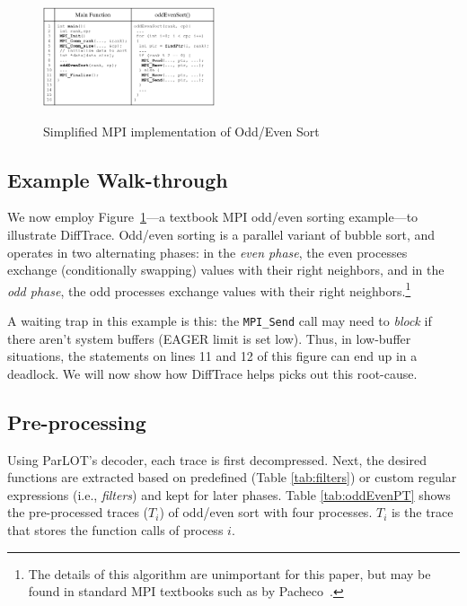 \begin{figure}[]
\centering
\caption{Simplified MPI implementation of Odd/Even Sort}
\includegraphics[width=0.45\textwidth]{figs/oddEven.png}
\label{fig.oddEven}
\end{figure}


\subsection{Example Walk-through}

We now employ
Figure~\ref{fig.oddEven}---a textbook MPI odd/even sorting example---to
illustrate DiffTrace.
%
Odd/even sorting is a parallel variant
of bubble sort,
and operates in two alternating phases:
in the \textit{even phase}, the even processes exchange (conditionally swapping)
values with their right neighbors, and in the \textit{odd phase},
the odd processes exchange values with their right neighbors.\footnote{The
  details of this algorithm are unimportant for this paper, but may be
  found in standard MPI textbooks such as by Pacheco~\cite{pacheco}.}
%

A waiting trap in this example is this:
the \texttt{MPI\_Send} call may need to \textit{block} if there aren't
system buffers (EAGER limit is set low).
%
Thus, in low-buffer situations, the statements on lines 11 and 12 of
this figure can end up in a deadlock.
%
We will now show how DiffTrace helps picks out this root-cause.

\subsection{Pre-processing}

Using ParLOT's decoder, each trace is first decompressed.
Next, the desired functions are extracted based on predefined
(Table \ref{tab:filters}) or custom regular expressions
(i.e., \textit{filters}) and kept for later phases.
%
Table \ref{tab:oddEvenPT} shows the pre-processed traces ($T_i$) of odd/even sort with four processes.
$T_i$ is the trace that stores the function calls of process $i$.


